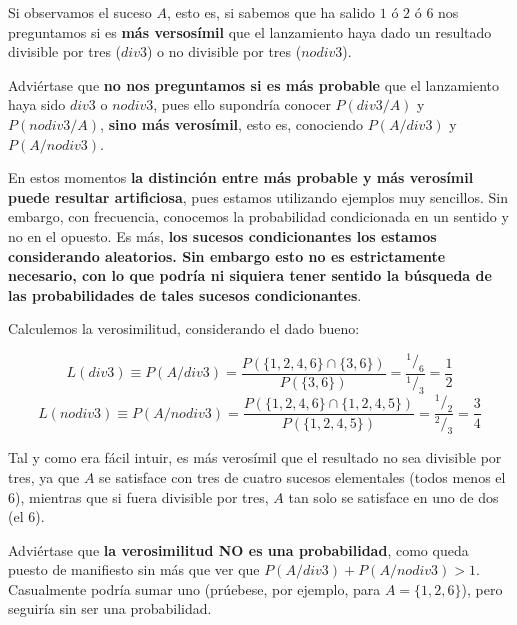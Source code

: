 \documentclass[11pt]{article}
\begin{document}
Si observamos el suceso \(A\), esto es, si sabemos que ha salido \(1\) ó
\(2\) ó \(6\) nos preguntamos si es \textbf{más versosímil} que el
lanzamiento haya dado un resultado divisible por tres (\(div3\)) o no
divisible por tres (\(nodiv3\)).

Adviértase que \textbf{no nos preguntamos si es más probable} que el
lanzamiento haya sido \(div3\) o \(nodiv3\), pues ello supondría conocer
\(P(div3/A)\) y \(P(nodiv3/A)\), \textbf{sino más verosímil}, esto es,
conociendo \(P(A/div3)\) y \(P(A/nodiv3)\).

En estos momentos \textbf{la distinción entre más probable y más
verosímil puede resultar artificiosa}, pues estamos utilizando ejemplos
muy sencillos. Sin embargo, con frecuencia, conocemos la probabilidad
condicionada en un sentido y no en el opuesto. Es más, \textbf{los
sucesos condicionantes los estamos considerando aleatorios. Sin embargo
esto no es estrictamente necesario, con lo que podría ni siquiera tener
sentido la búsqueda de las probabilidades de tales sucesos
condicionantes}.

    Calculemos la verosimilitud, considerando el dado bueno:

\[L(div3)\equiv P(A/div3)=\frac{P(\{1,2,4,6\}\cap\{3,6\})}{P(\{3,6\})}=\frac{^1/_6}{^1/_3}=\frac{1}{2}\]
\[L(nodiv3)\equiv P(A/nodiv3)=\frac{P(\{1,2,4,6\}\cap\{1,2,4,5\})}{P(\{1,2,4,5\})}=\frac{^1/_2}{^2/_3}=\frac{3}{4}\]

Tal y como era fácil intuir, es más verosímil que el resultado no sea
divisible por tres, ya que \(A\) se satisface con tres de cuatro sucesos
elementales (todos menos el \(6\)), mientras que si fuera divisible por
tres, \(A\) tan solo se satisface en uno de dos (el \(6\)).

Adviértase que \textbf{la verosimilitud NO es una probabilidad}, como
queda puesto de manifiesto sin más que ver que
\(P(A/div3)+P(A/nodiv3) > 1\). Casualmente podría sumar uno (prúebese,
por ejemplo, para \(A=\{1,2,6\}\)), pero seguiría sin ser una
probabilidad.


    
    
    
    
\end{document}
